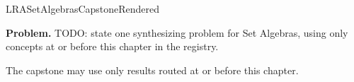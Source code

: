 \ifcsname LRASetAlgebrasCapstoneRendered\endcsname
\else
\expandafter\gdef\csname LRASetAlgebrasCapstoneRendered\endcsname{}

\newpage
{}
\label{cap:set-algebra}

\begin{tcolorbox}[
  colback=gray!6,
  colframe=gray!40,
  arc=2pt,
  left=8pt, right=8pt, top=6pt, bottom=6pt,
  title={\small\textbf{Capstone Problem}},
  fonttitle=\small\bfseries
]
\textbf{Problem.}
TODO: state one synthesizing problem for Set Algebras, using only concepts at or
before this chapter in the registry.
\end{tcolorbox}

\begin{remark*}
The capstone may use only results routed at or before this chapter.
\end{remark*}

\clearpage
\fi
